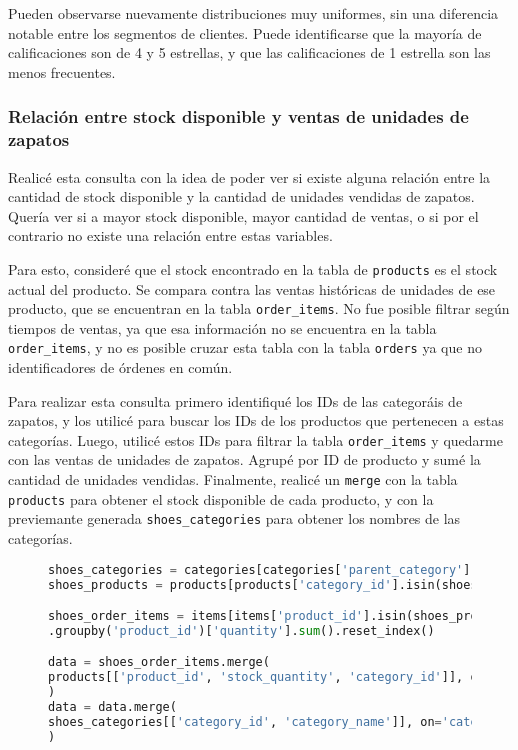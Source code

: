 Pueden observarse nuevamente distribuciones muy uniformes, sin una diferencia notable entre los segmentos de clientes. Puede identificarse que la mayoría de calificaciones son de 4 y 5 estrellas, y que las calificaciones de 1 estrella son las menos frecuentes.

\subsubsection{Relación entre stock disponible y ventas de unidades de zapatos}

Realicé esta consulta con la idea de poder ver si existe alguna relación entre la cantidad de stock disponible y la cantidad de unidades vendidas de zapatos. Quería ver si a mayor stock disponible, mayor cantidad de ventas, o si por el contrario no existe una relación entre estas variables.

Para esto, consideré que el stock encontrado en la tabla de \texttt{products} es el stock actual del producto. Se compara contra las ventas históricas de unidades de ese producto, que se encuentran en la tabla \texttt{order\_items}. No fue posible filtrar según tiempos de ventas, ya que esa información no se encuentra en la tabla \texttt{order\_items}, y no es posible cruzar esta tabla con la tabla \texttt{orders} ya que no identificadores de órdenes en común.

Para realizar esta consulta primero identifiqué los IDs de las categoráis de zapatos, y los utilicé para buscar los IDs de los productos que pertenecen a estas categorías. Luego, utilicé estos IDs para filtrar la tabla \texttt{order\_items} y quedarme con las ventas de unidades de zapatos. Agrupé por ID de producto y sumé la cantidad de unidades vendidas. Finalmente, realicé un \texttt{merge} con la tabla \texttt{products} para obtener el stock disponible de cada producto, y con la previemante generada \texttt{shoes\_categories} para obtener los nombres de las categorías.

\begin{figure}
\begin{lstlisting}[language=Python, xleftmargin=10pt, xrightmargin=10pt]
shoes_categories = categories[categories['parent_category'] == 'SHOES'][['category_id', 'category_name']]
shoes_products = products[products['category_id'].isin(shoes_categories['category_id'])]

shoes_order_items = items[items['product_id'].isin(shoes_products['product_id'])]
.groupby('product_id')['quantity'].sum().reset_index()

data = shoes_order_items.merge(
products[['product_id', 'stock_quantity', 'category_id']], on='product_id', how='left'
)
data = data.merge(
shoes_categories[['category_id', 'category_name']], on='category_id', how='left'
)
\end{lstlisting}
\end{figure}

